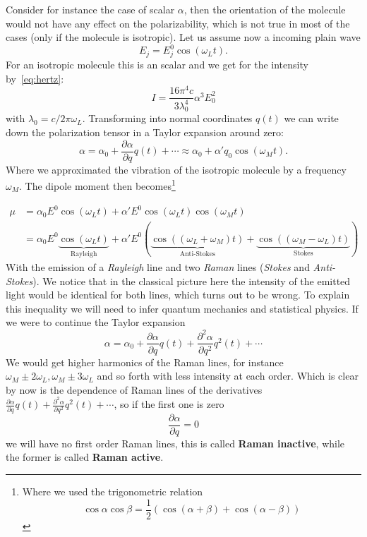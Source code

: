 Consider for instance the case of scalar $\alpha$, then the orientation of the molecule
would not have any effect on the polarizability, which is not true in most of the cases (only
if the molecule is isotropic).
Let us assume now a incoming plain wave 
\begin{equation}
    E_j = E^0_j \cos(\omega_L t).
\end{equation}
For an isotropic molecule this is an scalar and we get
for the intensity by~\eqref{eq:hertz}:
\begin{equation}
    \label{eq:I}
    I = \frac{16 \pi^4 c}{3 \lambda_0^4} \alpha ^3 E_0 ^2
\end{equation}
with $\lambda_0 = c/ 2\pi \omega_L$. Transforming into normal coordinates $q(t)$ we can write down the polarization tensor
in a Taylor expansion around zero\cite{ver}:
\begin{equation}
    \alpha = \alpha_0 + \frac{\partial\alpha}{\partial q}q(t) + \cdots \approx \alpha_0 + \alpha' q_0 \cos(\omega_M t).
\end{equation}
Where we approximated the vibration of the isotropic molecule by a frequency $\omega_M$.
The dipole moment then becomes\footnote{Where we used the trigonometric relation
\begin{equation*}
    \cos\alpha \cos\beta = \frac{1}{2}\left( \cos(\alpha +\beta) + \cos(\alpha -\beta) \right)
\end{equation*}
}

\begin{align}
    \mu &= \alpha_0 E^0 \cos(\omega_L t) + \alpha' E^0 \cos(\omega_L t) \cos(\omega_M t) \\
        &= \alpha_0 E^0 \underbrace{\cos(\omega_L t) }_{\text{Rayleigh}}
    + \alpha' E^0( \underbrace{\cos((\omega_L + \omega_M)t ) }_{\text{Anti-Stokes}}
    + \underbrace{\cos((\omega_M - \omega_L)t)}_{\text{Stokes}} ) 
\end{align}
With the emission of a \textit{Rayleigh} line and two \textit{Raman} lines (\textit{Stokes} and \textit{Anti-Stokes}).
We notice that in the classical picture here the intensity of the emitted light would be identical for both lines, which
turns out to be wrong. To explain this inequality we will need to infer quantum mechanics and statistical physics.
If we were to continue the Taylor expansion
\begin{equation}
    \alpha = \alpha_0 + \frac{\partial\alpha}{\partial q}q(t) + \frac{\partial^2\alpha}{\partial q^2}q^2(t) + \cdots
\end{equation}
We would get higher harmonics of the Raman lines, for instance $\omega_M \pm 2\omega_L, \omega_M \pm 3\omega_L$ and so
forth with less intensity at each order. 
Which is clear by now is the dependence of Raman lines of the
derivatives $\frac{\partial\alpha}{\partial q}q(t) + \frac{\partial^2\alpha}{\partial q^2}q^2(t) + \cdots$, so if 
the first one is zero
\begin{equation}
    \frac{\partial\alpha}{\partial q} = 0
\end{equation}
we will have no first order Raman lines, this is called \textbf{Raman inactive}, while the former is called
\textbf{Raman active}. 
